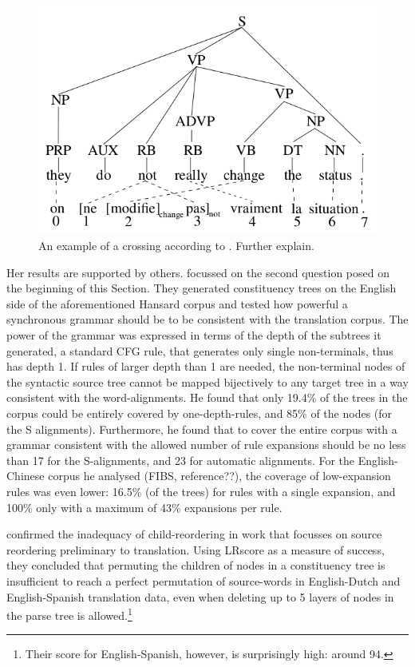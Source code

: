 \documentclass{report}
\theoremstyle{definition}
\theoremstyle{plain}
\begin{document}
\begin{figure}[!ht]
\centering
\includegraphics[scale=0.4]{crossing.png}
\caption{An example of a crossing according to \cite{fox2002phrasal}. Further explain.}\label{fig:fox}
\end{figure}

Her results are supported by others. \cite{galley2004s} focussed on the second question posed on the beginning of this Section. They generated constituency trees on the English side of the aforementioned Hansard corpus and tested how powerful a synchronous grammar should be to be consistent with the translation corpus. The power of the grammar was expressed in terms of the depth of the subtrees it generated, a standard CFG rule, that generates only single non-terminals, thus has depth 1. If rules of larger depth than 1 are needed, the non-terminal nodes of the syntactic source tree cannot be mapped bijectively to any target tree in a way consistent with the word-alignments. He found that only 19.4\% of the trees in the corpus could be entirely covered by one-depth-rules, and 85\% of the nodes (for the S alignments). Furthermore, he found that to cover the entire corpus with a grammar consistent with the allowed number of rule expansions should be no less than 17 for the S-alignments, and 23 for automatic alignments. For the English-Chinese corpus he analysed (FIBS, reference??), the coverage of low-expansion rules was even lower: 16.5\% (of the trees) for rules with a single expansion, and 100\% only with a maximum of 43\% expansions per rule.

\cite{khalilov2012statistical} confirmed the inadequacy of child-reordering in work that focusses on source reordering preliminary to translation. Using LRscore \citep{birch2010lrscore} as a measure of success, they concluded that permuting the children of nodes in a constituency tree is insufficient to reach a perfect permutation of source-words in English-Dutch and English-Spanish translation data, even when deleting up to 5 layers of nodes in the parse tree is allowed.\footnote{Their score for English-Spanish, however, is surprisingly high: around 94.}
\end{document}
